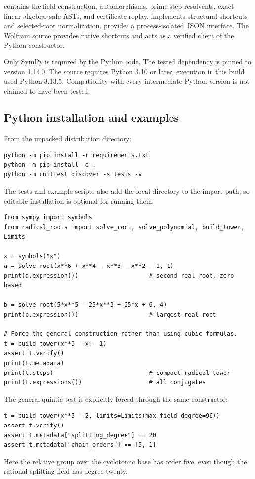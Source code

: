 \documentclass[11pt,a4paper]{article}
\newcommand{\code}[1]{\texttt{\detokenize{#1}}}
\theoremstyle{definition}
\theoremstyle{remark}
\begin{document}
\code{core.py} contains the field construction, automorphisms, prime-step resolvents, exact linear algebra, safe ASTs, and certificate replay. \code{fast.py} implements structural shortcuts and selected-root normalization. \code{cli.py} provides a process-isolated JSON interface. The Wolfram source provides native shortcuts and acts as a verified client of the Python constructor.

Only SymPy is required by the Python code. The tested dependency is pinned to version 1.14.0. The source requires Python 3.10 or later; execution in this build used Python 3.13.5. Compatibility with every intermediate Python version is not claimed to have been tested.

\subsection{Python installation and examples}

From the unpacked distribution directory:
\begin{lstlisting}
python -m pip install -r requirements.txt
python -m pip install -e .
python -m unittest discover -s tests -v
\end{lstlisting}
The tests and example scripts also add the local \code{python/} directory to the import path, so editable installation is optional for running them.

\begin{lstlisting}
from sympy import symbols
from radical_roots import solve_root, solve_polynomial, build_tower, Limits

x = symbols("x")
a = solve_root(x**6 + x**4 - x**3 - x**2 - 1, 1)
print(a.expression())                    # second real root, zero based

b = solve_root(5*x**5 - 25*x**3 + 25*x + 6, 4)
print(b.expression())                    # largest real root

# Force the general construction rather than using cubic formulas.
t = build_tower(x**3 - x - 1)
assert t.verify()
print(t.metadata)
print(t.steps)                           # compact radical tower
print(t.expressions())                   # all conjugates
\end{lstlisting}

The general quintic test is explicitly forced through the same constructor:
\begin{lstlisting}
t = build_tower(x**5 - 2, limits=Limits(max_field_degree=96))
assert t.verify()
assert t.metadata["splitting_degree"] == 20
assert t.metadata["chain_orders"] == [5, 1]
\end{lstlisting}
Here the relative group over the cyclotomic base has order five, even though the rational splitting field has degree twenty.
\end{document}
